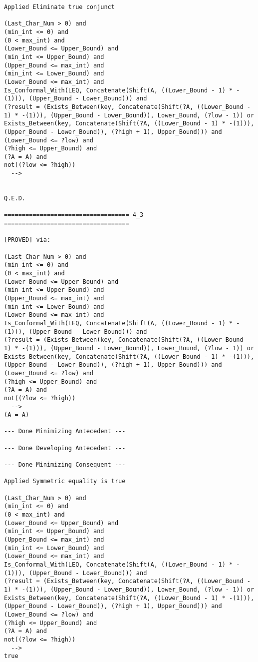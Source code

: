 \begin{lstlisting}[language=resolve]
Applied Eliminate true conjunct

(Last_Char_Num > 0) and
(min_int <= 0) and
(0 < max_int) and
(Lower_Bound <= Upper_Bound) and
(min_int <= Upper_Bound) and
(Upper_Bound <= max_int) and
(min_int <= Lower_Bound) and
(Lower_Bound <= max_int) and
Is_Conformal_With(LEQ, Concatenate(Shift(A, ((Lower_Bound - 1) * -(1))), (Upper_Bound - Lower_Bound))) and
(?result = (Exists_Between(key, Concatenate(Shift(?A, ((Lower_Bound - 1) * -(1))), (Upper_Bound - Lower_Bound)), Lower_Bound, (?low - 1)) or Exists_Between(key, Concatenate(Shift(?A, ((Lower_Bound - 1) * -(1))), (Upper_Bound - Lower_Bound)), (?high + 1), Upper_Bound))) and
(Lower_Bound <= ?low) and
(?high <= Upper_Bound) and
(?A = A) and
not((?low <= ?high))
  -->


Q.E.D.

=================================== 4_3 ===================================

[PROVED] via:

(Last_Char_Num > 0) and
(min_int <= 0) and
(0 < max_int) and
(Lower_Bound <= Upper_Bound) and
(min_int <= Upper_Bound) and
(Upper_Bound <= max_int) and
(min_int <= Lower_Bound) and
(Lower_Bound <= max_int) and
Is_Conformal_With(LEQ, Concatenate(Shift(A, ((Lower_Bound - 1) * -(1))), (Upper_Bound - Lower_Bound))) and
(?result = (Exists_Between(key, Concatenate(Shift(?A, ((Lower_Bound - 1) * -(1))), (Upper_Bound - Lower_Bound)), Lower_Bound, (?low - 1)) or Exists_Between(key, Concatenate(Shift(?A, ((Lower_Bound - 1) * -(1))), (Upper_Bound - Lower_Bound)), (?high + 1), Upper_Bound))) and
(Lower_Bound <= ?low) and
(?high <= Upper_Bound) and
(?A = A) and
not((?low <= ?high))
  -->
(A = A)

--- Done Minimizing Antecedent ---

--- Done Developing Antecedent ---

--- Done Minimizing Consequent ---

Applied Symmetric equality is true

(Last_Char_Num > 0) and
(min_int <= 0) and
(0 < max_int) and
(Lower_Bound <= Upper_Bound) and
(min_int <= Upper_Bound) and
(Upper_Bound <= max_int) and
(min_int <= Lower_Bound) and
(Lower_Bound <= max_int) and
Is_Conformal_With(LEQ, Concatenate(Shift(A, ((Lower_Bound - 1) * -(1))), (Upper_Bound - Lower_Bound))) and
(?result = (Exists_Between(key, Concatenate(Shift(?A, ((Lower_Bound - 1) * -(1))), (Upper_Bound - Lower_Bound)), Lower_Bound, (?low - 1)) or Exists_Between(key, Concatenate(Shift(?A, ((Lower_Bound - 1) * -(1))), (Upper_Bound - Lower_Bound)), (?high + 1), Upper_Bound))) and
(Lower_Bound <= ?low) and
(?high <= Upper_Bound) and
(?A = A) and
not((?low <= ?high))
  -->
true


\end{lstlisting}
